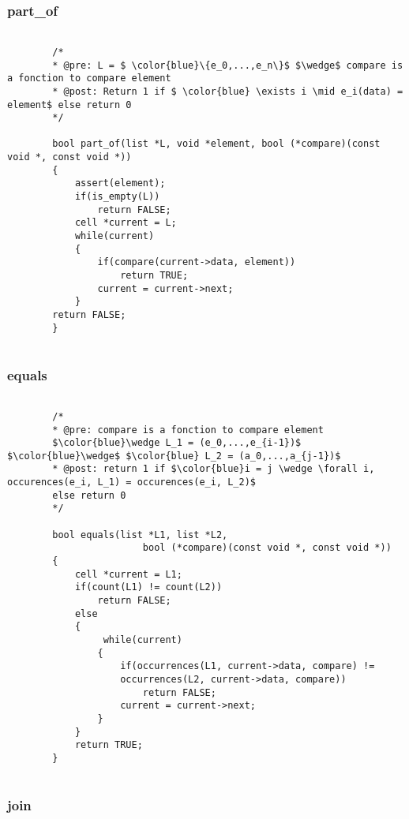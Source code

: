 \documentclass[a4paper, 11pt, oneside]{article}
\begin{document}
	\clearpage
	\subsubsection{part\_of}
	
	\begin{lstlisting}[mathescape]
	
		/*
		* @pre: L = $ \color{blue}\{e_0,...,e_n\}$ $\wedge$ compare is a fonction to compare element
		* @post: Return 1 if $ \color{blue} \exists i \mid e_i(data) = element$ else return 0
		*/
		
		bool part_of(list *L, void *element, bool (*compare)(const void *, const void *))
		{
   			assert(element);
   			if(is_empty(L))
      			return FALSE;
   			cell *current = L;
   			while(current)
   			{
      			if(compare(current->data, element))
         			return TRUE;
      			current = current->next;
   			}
   		return FALSE;
		}
	
	\end{lstlisting}
	
	\subsubsection{equals}
	
	\begin{lstlisting}[mathescape]	
	
		/*
		* @pre: compare is a fonction to compare element  
		$\color{blue}\wedge L_1 = (e_0,...,e_{i-1})$ $\color{blue}\wedge$ $\color{blue} L_2 = (a_0,...,a_{j-1})$
		* @post: return 1 if $\color{blue}i = j \wedge \forall i, occurences(e_i, L_1) = occurences(e_i, L_2)$ 
		else return 0
		*/
		
		bool equals(list *L1, list *L2, 
						bool (*compare)(const void *, const void *))
		{
   			cell *current = L1;
   			if(count(L1) != count(L2))
      			return FALSE;
   			else
   			{
     			 while(current)
      			{
         			if(occurrences(L1, current->data, compare) != 
         			occurrences(L2, current->data, compare))
            			return FALSE;
         			current = current->next;
      			}
   			}
  			return TRUE;
		}
	
	\end{lstlisting}
	
	\subsubsection{join}
	
\end{document}
